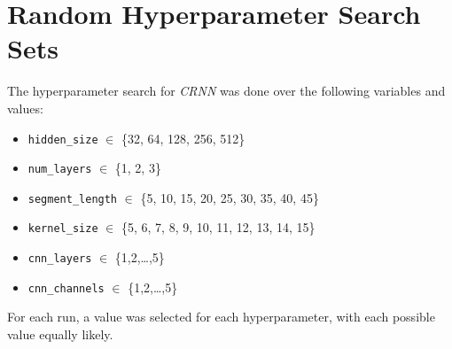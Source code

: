 \section{Random Hyperparameter Search Sets}\label{app:random_hyperparameter_search_sets}

The hyperparameter search for \emph{CRNN} was done over the following variables and values:
\begin{itemize}
    \item \texttt{hidden\_size} $\in$ \{32, 64, 128, 256, 512\}
    \item \texttt{num\_layers} $\in$ \{1, 2, 3\}
    \item \texttt{segment\_length} $\in$ \{5, 10, 15, 20, 25, 30, 35, 40, 45\}
    \item \texttt{kernel\_size} $\in$ \{5, 6, 7, 8, 9, 10, 11, 12, 13, 14, 15\}
    \item \texttt{cnn\_layers} $\in$ \{1,2,\ldots,5\}
    \item \texttt{cnn\_channels} $\in$ \{1,2,\ldots,5\}
\end{itemize}

For each run, a value was selected for each hyperparameter, with each possible value equally likely.



